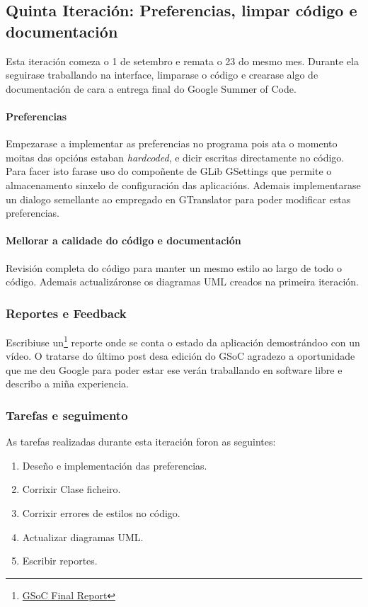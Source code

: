\subsection{Quinta Iteración: Preferencias, limpar código e documentación}
Esta iteración comeza o 1 de setembro e remata o 23 do mesmo mes. Durante ela seguirase traballando na interface, limparase o código e crearase algo de documentación de cara a entrega final do Google Summer of Code.

\paragraph{Preferencias}
Empezarase a implementar as preferencias no programa pois ata o momento moitas das opcións estaban \emph{hardcoded}, e dicir escritas directamente no código. Para facer isto farase uso do compoñente de GLib GSettings que permite o almacenamento sinxelo de configuración das aplicacións. Ademais implementarase un dialogo semellante ao empregado en GTranslator para poder modificar estas preferencias.

\paragraph{Mellorar a calidade do código e documentación}
Revisión completa do código para manter un mesmo estilo ao largo de todo o código. Ademais actualizáronse os diagramas UML creados na primeira iteración.

\subsubsection{Reportes e Feedback}
Escribiuse un\footnote{\href{http://aquelando.info/gsoc-final-report/}{GSoC Final Report}} reporte onde se conta o estado da aplicación demostrándoo con un vídeo. O tratarse do último post desa edición do GSoC agradezo a oportunidade que me deu Google para poder estar ese verán traballando en software libre e describo a miña experiencia.

\subsubsection{Tarefas e seguimento}

As tarefas realizadas durante esta iteración foron as seguintes:

\begin{enumerate}[label=\bfseries WBS 5.\arabic*]
  \item Deseño e implementación das preferencias.
  \item Corrixir Clase ficheiro.
  \item Corrixir errores de estilos no código.
  \item Actualizar diagramas UML.
  \item Escribir reportes.
\end {enumerate}

